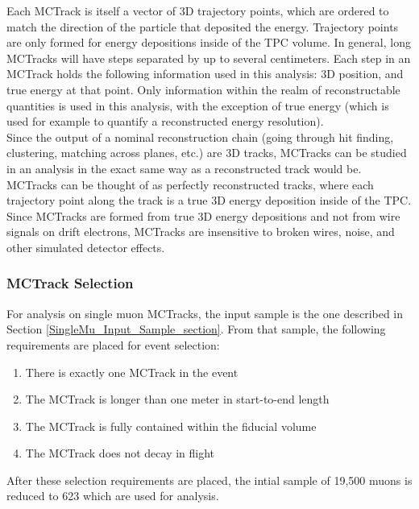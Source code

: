 Each {\sc MCTrack} is itself a vector of 3D trajectory points, which are ordered to match the direction of the particle that deposited the energy. Trajectory points are only formed for energy depositions inside of the TPC volume. In general, long {\sc MCTrack}s will have steps separated by up to several centimeters. Each step in an {\sc MCTrack} holds the following information used in this analysis: 3D position, and true energy at that point. Only information within the realm of reconstructable quantities is used in this analysis, with the exception of true energy (which is used for example to quantify a reconstructed energy resolution).\\

Since the output of a nominal reconstruction chain (going through hit finding, clustering, matching across planes, etc.) are 3D tracks, {\sc MCTracks} can be studied in an analysis in the exact same way as a reconstructed track would be. {\sc MCTracks} can be thought of as perfectly reconstructed tracks, where each trajectory point along the track is a true 3D energy deposition inside of the {\ub} TPC.\\

Since {\sc MCTracks} are formed from true 3D energy depositions and not from wire signals on drift electrons, {\sc MCTracks} are insensitive to broken wires, noise, and other simulated detector effects.

\subsubsection{MCTrack Selection}\label{MCTrack_Selection_section}
For analysis on single muon {\sc MCTracks}, the input sample is the one described in Section \ref{SingleMu_Input_Sample_section}. From that sample, the following requirements are placed for event selection:
\begin{enumerate}
	\item There is exactly one {\sc MCTrack} in the event
	\item The {\sc MCTrack} is longer than one meter in start-to-end length
	\item The {\sc MCTrack} is fully contained within the fiducial volume
	\item The {\sc MCTrack} does not decay in flight
\end{enumerate}
After these selection requirements are placed, the intial sample of 19,500 muons is reduced to 623 which are used for analysis.


